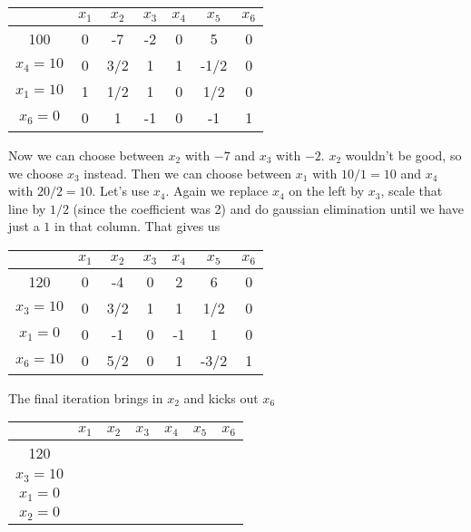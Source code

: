 \begin{Ex}
\begin{center}
\begin{tabular}{c|cccccc}
  & $x_1$ & $x_2$ & $x_3$ & $x_4$ & $x_5$ & $x_6$ \\\hline
100 & 0 & -7 & -2 & 0 & 5 & 0\\\hline
$x_4=10$ & 0 & 3/2 & 1 & 1 & -1/2 & 0 \\
$x_1=10$ & 1 & 1/2 & 1 & 0 &  1/2 & 0\\
$x_6=0$ & 0 & 1 & -1 & 0 & -1 &  1\\
\end{tabular}
\end{center}

Now we can choose between $x_2$ with $-7$ and $x_3$ with $-2$. $x_2$ wouldn't be good, %
so we choose $x_3$ instead. Then we can choose between $x_1$ with $10/1=10$ and $x_4$ with $20/2=10$. Let's use $x_4$. Again we replace $x_4$ on the left by $x_3$, scale that line by $1/2$ (since the coefficient was 2) and do gaussian elimination until we have just a $1$ in that column. That gives us


\begin{center}
\begin{tabular}{c|cccccc}
  & $x_1$ & $x_2$ & $x_3$ & $x_4$ & $x_5$ & $x_6$ \\\hline
120 & 0 & -4 & 0 & 2 & 6 & 0\\\hline
$x_3=10$ & 0 & 3/2 & 1 & 1 & 1/2 & 0 \\
$x_1=0$ &0  & -1 & 0 & -1 &  1 & 0\\
$x_6=10$ & 0 & 5/2 & 0 & 1 & -3/2 &  1\\
\end{tabular}
\end{center}

The final iteration brings in $x_2$ and kicks out $x_6$

\begin{center}
\begin{tabular}{c|cccccc}
         & $x_1$ & $x_2$ & $x_3$ & $x_4$ & $x_5$ & $x_6$ \\\hline
120      &\\\hline
$x_3=10$ &\\
$x_1=0$  &\\
$x_2=0$  &\\
\end{tabular}
\end{center}
\end{Ex}


